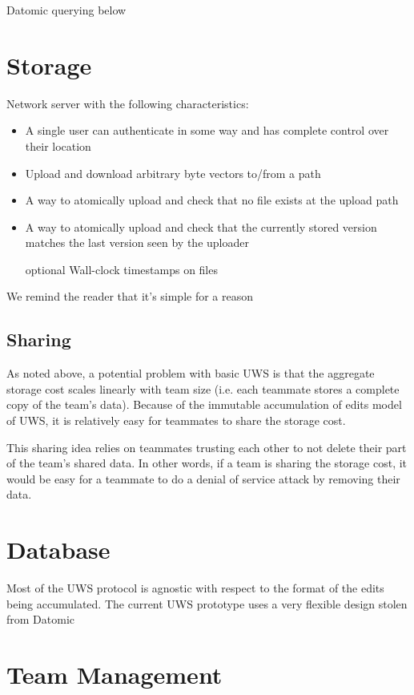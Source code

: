 \documentclass{article}
\begin{document}
Datomic querying below

\section{Storage}

Network server with the following characteristics:

\begin{itemize}
\item A single user can authenticate in some way and has complete control over their location
\item Upload and download arbitrary byte vectors to/from a path
\item A way to atomically upload and check that no file exists at the upload path
\item A way to atomically upload and check that the currently stored version matches the last version seen by the uploader
\item [optional] Wall-clock timestamps on files
\end{itemize}

We remind the reader that it's simple for a reason

\subsection{Sharing}

As noted above, a potential problem with basic UWS is that the aggregate storage cost scales linearly with team size (i.e. each teammate stores a complete copy of the team's data).
Because of the immutable accumulation of edits model of UWS, it is relatively easy for teammates to share the storage cost.

This sharing idea relies on teammates trusting each other to not delete their part of the team's shared data.
In other words, if a team is sharing the storage cost, it would be easy for a teammate to do a denial of service attack by removing their data.

\section{Database}

Most of the UWS protocol is agnostic with respect to the format of the edits being accumulated.
The current UWS prototype uses a very flexible design stolen from Datomic

\section{Team Management}
\end{document}
